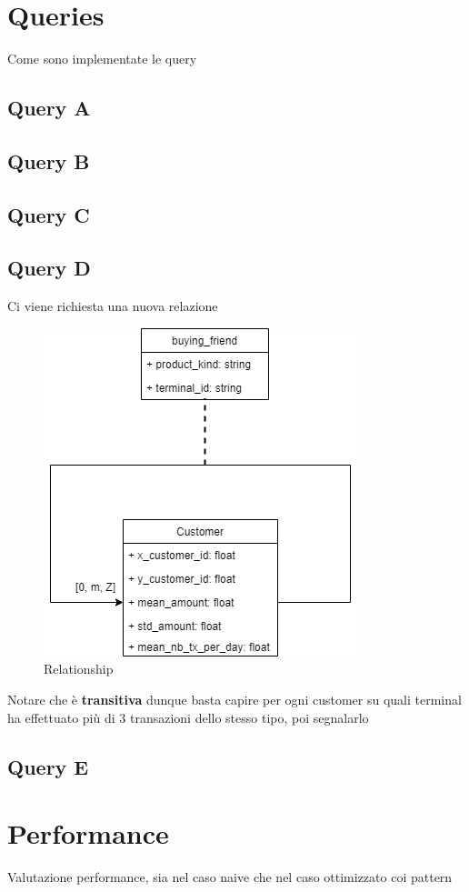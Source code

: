 \documentclass[letterpaper,11pt]{article}
\begin{document}
\section{Queries}
Come sono implementate le query
\subsection{Query A}

\subsection{Query B}
\subsection{Query C}
\subsection{Query D}
Ci viene richiesta una nuova relazione
\begin{figure}[ht] 
        \centering \includegraphics[width=0.5\columnwidth]{images/buyingFriends.png}
        \caption{\label{fig1}Relationship}
\end{figure}
Notare che è \textbf{transitiva} dunque basta capire per ogni customer su quali terminal ha effettuato più di 3 transazioni dello stesso tipo, poi segnalarlo
\subsection{Query E}

\section{Performance}
Valutazione performance, sia nel caso naive che nel caso ottimizzato coi pattern
\end{document}
